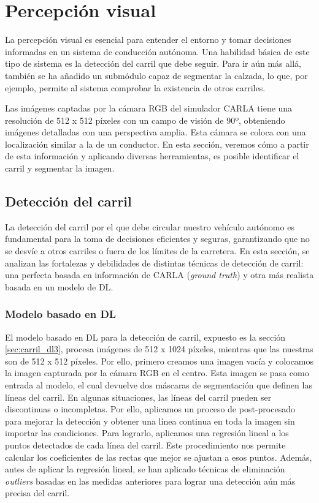 \section{Percepción visual}

La percepción visual es esencial para entender el entorno y tomar decisiones informadas en un sistema de conducción autónoma. Una habilidad básica de este tipo de sistema es la detección del carril que debe seguir. Para ir aún más allá, también se ha añadido un submódulo capaz de segmentar la calzada, lo que, por ejemplo, permite al sistema comprobar la existencia de otros carriles.

Las imágenes captadas por la cámara RGB del simulador CARLA tiene una resolución de 512 x 512 píxeles con un campo de visión de 90º, obteniendo imágenes detalladas con una perspectiva amplia. Esta cámara se coloca con una localización similar a la de un conductor. En esta sección, veremos cómo a partir de esta información y aplicando diversas herramientas, es posible identificar el carril y segmentar la imagen.

\subsection{Detección del carril}

La detección del carril por el que debe circular nuestro vehículo autónomo es fundamental para la toma de decisiones eficientes y seguras, garantizando que no se desvíe a otros carriles o fuera de los límites de la carretera. En esta sección, se analizan las fortalezas y debilidades de distintas técnicas de detección de carril: una perfecta basada en información de CARLA (\textit{ground truth}) y otra más realista basada en un modelo de \ac{DL}.

\subsubsection{Modelo basado en DL}

El modelo basado en \ac{DL} para la detección de carril, expuesto es la sección \ref{sec:carril_dl3}, procesa imágenes de 512 x 1024 píxeles, mientras que las nuestras son de 512 x 512 píxeles. Por ello, primero creamos una imagen vacía y colocamos la imagen capturada por la cámara RGB en el centro. Esta imagen se pasa como entrada al modelo, el cual devuelve dos máscaras de segmentación que definen las líneas del carril. En algunas situaciones, las líneas del carril pueden ser discontinuas o incompletas. Por ello, aplicamos un proceso de post-procesado para mejorar la detección y obtener una línea continua en toda la imagen sin importar las condiciones. Para lograrlo, aplicamos una regresión lineal a los puntos detectados de cada línea del carril. Este procedimiento nos permite calcular los coeficientes de las rectas que mejor se ajustan a esos puntos. Además, antes de aplicar la regresión lineal, se han aplicado técnicas de eliminación \textit{outliers} basadas en las medidas anteriores para lograr una detección aún más precisa del carril. 

